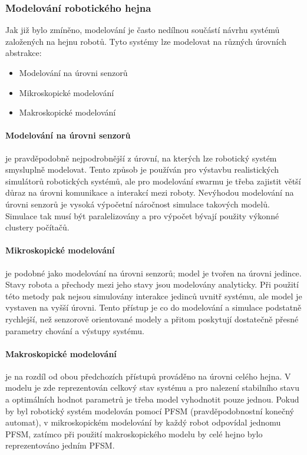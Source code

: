 \documentclass[a4paper,12pt]{article}
\begin{document}
\subsubsection{Modelování robotického hejna}
Jak již bylo zmíněno, modelování je často nedílnou součástí návrhu systémů založených na
hejnu robotů. Tyto systémy lze modelovat na různých úrovních abstrakce:
\begin{itemize}
  \item Modelování na úrovni senzorů
  \item Mikroskopické modelování
  \item Makroskopické modelování
\end{itemize}

\paragraph{Modelování na úrovni senzorů} je pravděpodobně nejpodrobnější z úrovní, na kterých
lze robotický systém smysluplně modelovat. Tento způsob je používán pro výstavbu realistických
simulátorů robotických systémů, ale pro modelování swarmu je třeba zajistit větší důraz na
úrovni komunikace a interakcí mezi roboty. Nevýhodou modelování na úrovni senzorů je vysoká
výpočetní náročnost simulace takových modelů. Simulace tak musí být paralelizovány a pro
výpočet bývají použity výkonné clustery počítačů.

\paragraph{Mikroskopické modelování} je podobné jako modelování na úrovni senzorů; model
je tvořen na úrovni jedince. Stavy robota a přechody mezi jeho stavy jsou modelovány analyticky.
Při použití této metody pak nejsou simulovány interakce jedinců uvnitř systému, ale model
je vystaven na vyšší úrovni. Tento přístup je co do modelování a simulace podstatně rychlejší,
než senzorově orientované modely a přitom poskytují dostatečně přesné parametry chování
a výstupy systému.

\paragraph{Makroskopické modelování} je na rozdíl od obou předchozích přístupů prováděno
na úrovni celého hejna. V modelu je zde reprezentován celkový stav systému a pro nalezení
stabilního stavu a optimálních hodnot parametrů je třeba model vyhodnotit pouze jednou.
Pokud by byl robotický systém modelován pomocí PFSM (pravděpodobnostní konečný automat),
v mikroskopickém modelování by každý robot odpovídal jednomu PFSM, zatímco při použití
makroskopického modelu by celé hejno bylo reprezentováno jedním PFSM\cite{Martinoli04}.
\end{document}
